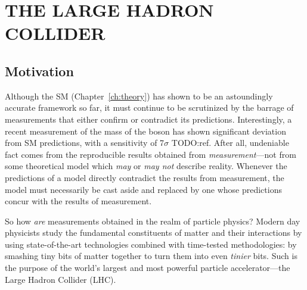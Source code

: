 \chapter{THE LARGE HADRON COLLIDER}

\section{Motivation}
Although the SM (Chapter~\ref{ch:theory}) has shown to be an astoundingly accurate framework so far, it must continue to be scrutinized by the barrage of measurements that either confirm or contradict its predictions.
Interestingly, a recent measurement of the mass of the \PW boson has shown significant deviation from SM predictions, with a sensitivity of 7$\sigma$ TODO:ref.
After all, undeniable fact comes from the reproducible results obtained from \emph{measurement}---not from some theoretical model which \emph{may} or \emph{may not} describe reality.
Whenever the predictions of a model directly contradict the results from measurement, the model must necessarily be cast aside and replaced by one whose predictions concur with the results of measurement.

So how \emph{are} measurements obtained in the realm of particle physics?
Modern day physicists study the fundamental constituents of matter and their interactions by using state-of-the-art technologies combined with time-tested methodologies:
by smashing tiny bits of matter together to turn them into even \emph{tinier} bits.
Such is the purpose of the world's largest and most powerful particle accelerator---the Large Hadron Collider (LHC).

